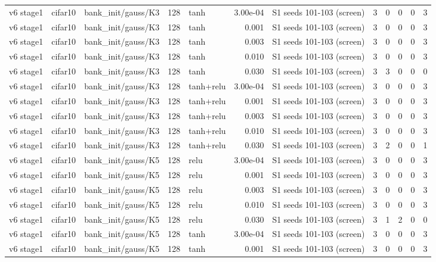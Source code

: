 \begin{table}[htbp]
{\begin{tabular}{@{}lllrlrlrrrrr@{}}
v6 stage1 & cifar10 & bank\_init/gauss/K3 & 128 & tanh & 3.00e-04 & S1 seeds 101-103 (screen) & 3 & 0 & 0 & 0 & 3 \\
v6 stage1 & cifar10 & bank\_init/gauss/K3 & 128 & tanh & 0.001 & S1 seeds 101-103 (screen) & 3 & 0 & 0 & 0 & 3 \\
v6 stage1 & cifar10 & bank\_init/gauss/K3 & 128 & tanh & 0.003 & S1 seeds 101-103 (screen) & 3 & 0 & 0 & 0 & 3 \\
v6 stage1 & cifar10 & bank\_init/gauss/K3 & 128 & tanh & 0.010 & S1 seeds 101-103 (screen) & 3 & 0 & 0 & 0 & 3 \\
v6 stage1 & cifar10 & bank\_init/gauss/K3 & 128 & tanh & 0.030 & S1 seeds 101-103 (screen) & 3 & 3 & 0 & 0 & 0 \\
v6 stage1 & cifar10 & bank\_init/gauss/K3 & 128 & tanh+relu & 3.00e-04 & S1 seeds 101-103 (screen) & 3 & 0 & 0 & 0 & 3 \\
v6 stage1 & cifar10 & bank\_init/gauss/K3 & 128 & tanh+relu & 0.001 & S1 seeds 101-103 (screen) & 3 & 0 & 0 & 0 & 3 \\
v6 stage1 & cifar10 & bank\_init/gauss/K3 & 128 & tanh+relu & 0.003 & S1 seeds 101-103 (screen) & 3 & 0 & 0 & 0 & 3 \\
v6 stage1 & cifar10 & bank\_init/gauss/K3 & 128 & tanh+relu & 0.010 & S1 seeds 101-103 (screen) & 3 & 0 & 0 & 0 & 3 \\
v6 stage1 & cifar10 & bank\_init/gauss/K3 & 128 & tanh+relu & 0.030 & S1 seeds 101-103 (screen) & 3 & 2 & 0 & 0 & 1 \\
v6 stage1 & cifar10 & bank\_init/gauss/K5 & 128 & relu & 3.00e-04 & S1 seeds 101-103 (screen) & 3 & 0 & 0 & 0 & 3 \\
v6 stage1 & cifar10 & bank\_init/gauss/K5 & 128 & relu & 0.001 & S1 seeds 101-103 (screen) & 3 & 0 & 0 & 0 & 3 \\
v6 stage1 & cifar10 & bank\_init/gauss/K5 & 128 & relu & 0.003 & S1 seeds 101-103 (screen) & 3 & 0 & 0 & 0 & 3 \\
v6 stage1 & cifar10 & bank\_init/gauss/K5 & 128 & relu & 0.010 & S1 seeds 101-103 (screen) & 3 & 0 & 0 & 0 & 3 \\
v6 stage1 & cifar10 & bank\_init/gauss/K5 & 128 & relu & 0.030 & S1 seeds 101-103 (screen) & 3 & 1 & 2 & 0 & 0 \\
v6 stage1 & cifar10 & bank\_init/gauss/K5 & 128 & tanh & 3.00e-04 & S1 seeds 101-103 (screen) & 3 & 0 & 0 & 0 & 3 \\
v6 stage1 & cifar10 & bank\_init/gauss/K5 & 128 & tanh & 0.001 & S1 seeds 101-103 (screen) & 3 & 0 & 0 & 0 & 3 \\

\end{tabular}}
\end{table}
